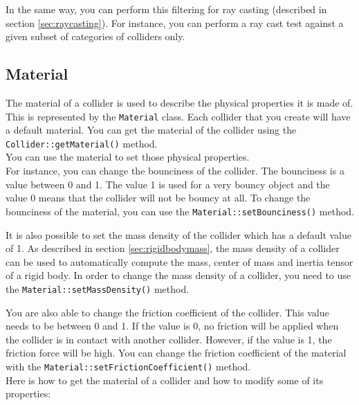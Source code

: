 \documentclass[a4paper,12pt]{article}
\begin{document}
    In the same way, you can perform this filtering for ray casting (described in section \ref{sec:raycasting}). For instance, you can perform a ray cast test
    against a given subset of categories of colliders only.

    \subsection{Material}
    \label{sec:material}

    The material of a collider is used to describe the physical properties it is made of. This is represented by the \texttt{Material} class. Each collider that you create will have a default material. You can get the material of the collider using the \texttt{Collider::\allowbreak getMaterial()} method. \\

    You can use the material to set those physical properties. \\

    For instance, you can change the bounciness of the collider. The bounciness is a value between 0 and 1. The value 1 is used for
    a very bouncy object and the value 0 means that the collider will not be bouncy at all. To change the bounciness of the material,
    you can use the \texttt{Material::\allowbreak setBounciness()} method. \\

    \begin{sloppypar}
    It is also possible to set the mass density of the collider which has a default value of 1. As described in section \ref{sec:rigidbodymass}, the
    mass density of a collider can be used to automatically compute the mass, center of mass and inertia tensor of a rigid body. In order to change the
    mass density of a collider, you need to use the \texttt{Material::setMassDensity()} method. \\
    \end{sloppypar}

    You are also able to change the friction coefficient of the collider. This value needs to be between 0 and 1. If the value is 0,
    no friction will be applied when the collider is in contact with another collider. However, if the value is 1, the friction force will be high. You can
    change the friction coefficient of the material with the \texttt{Material::\allowbreak setFrictionCoefficient()} method. \\

    Here is how to get the material of a collider and how to modify some of its properties: \\
\end{document}
